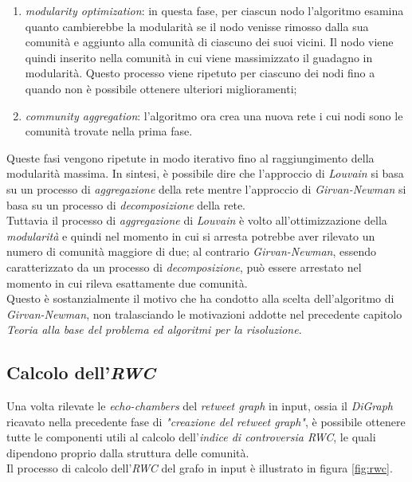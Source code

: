 \begin{enumerate}
\item \textit{modularity optimization}: in questa fase, per ciascun nodo l'algoritmo esamina quanto cambierebbe la modularità se il nodo venisse rimosso dalla sua comunità e aggiunto alla comunità di ciascuno dei suoi vicini. Il nodo viene quindi inserito nella comunità in cui viene massimizzato il guadagno in modularità. Questo processo viene ripetuto per ciascuno dei nodi fino a quando non è possibile ottenere ulteriori miglioramenti;
\item \textit{community aggregation}: l'algoritmo ora crea una nuova rete i cui nodi sono le comunità trovate nella prima fase.
\end{enumerate}
Queste fasi vengono ripetute in modo iterativo fino al raggiungimento della modularità massima. In sintesi, è possibile dire che l'approccio di \textit{Louvain} si basa su un processo di \textit{aggregazione} della rete mentre l'approccio di \textit{Girvan-Newman} si basa su un processo di \textit{decomposizione} della rete. 
\\Tuttavia il processo di \textit{aggregazione} di \textit{Louvain} è volto all'ottimizzazione della \textit{modularità} e quindi nel momento in cui si arresta potrebbe aver rilevato un numero di comunità maggiore di due; al contrario \textit{Girvan-Newman}, essendo caratterizzato da un processo di \textit{decomposizione}, può essere arrestato nel momento in cui rileva esattamente due comunità. 
\\Questo è sostanzialmente il motivo che ha condotto alla scelta dell'algoritmo di \textit{Girvan-Newman}, non tralasciando le motivazioni addotte nel precedente capitolo \textit{Teoria alla base del problema ed algoritmi per la risoluzione}.

\subsection{Calcolo dell'\textit{RWC}}
Una volta rilevate le \textit{echo-chambers} del \textit{retweet graph} in input, ossia il \textit{DiGraph} ricavato nella precedente fase di \textit{"creazione del retweet graph"}, è possibile ottenere tutte le componenti utili al calcolo dell'\textit{indice di controversia RWC}, le quali dipendono proprio dalla struttura delle comunità. 
\\Il processo di calcolo dell'\textit{RWC} del grafo in input è illustrato in figura \ref{fig:rwc}. 

